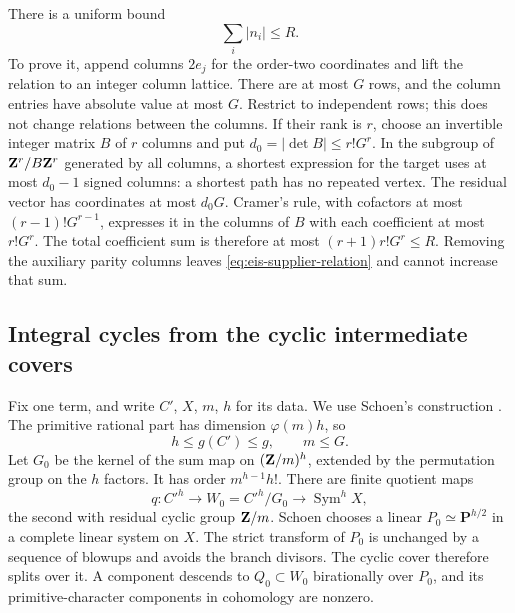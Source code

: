 There is a uniform bound
\begin{equation}\label{eq:eis-relation-mass}
 \sum_i|n_i|\le R.
\end{equation}
To prove it, append columns $2e_j$ for the order-two coordinates and
lift the relation to an integer column lattice. There are at most $G$
rows, and the column entries have absolute value at most $G$. Restrict
to independent rows; this does not change relations between the
columns. If their rank is $r$, choose an invertible integer matrix $B$
of $r$ columns and put $d_0=|\det B|\le r!G^r$. In the subgroup of
$\mathbf Z^r/B\mathbf Z^r$ generated by all columns, a shortest expression for the
target uses at most $d_0-1$ signed columns: a shortest path has no
repeated vertex. The residual vector has coordinates at most $d_0G$.
Cramer's rule, with cofactors at most $(r-1)!G^{r-1}$, expresses it in
the columns of $B$ with each coefficient at most $r!G^r$. The total
coefficient sum is therefore at most $(r+1)r!G^r\le R$. Removing the
auxiliary parity columns leaves \eqref{eq:eis-supplier-relation} and
cannot increase that sum.

\subsection{Integral cycles from the cyclic intermediate covers}

Fix one term, and write $C'$, $X$, $m$, $h$ for its data. We use
Schoen's construction \cite[Theorem~2.0 and Lemmas~2.3--2.6,
pp.~11--17]{Schoen88}. The primitive rational part has dimension
$\varphi(m)h$, so
\[
 h\le g(C')\le g,
 \qquad m\le G.
\]
Let $G_0$ be the kernel of the sum map on $(\mathbf Z/m)^h$, extended by
the permutation group on the $h$ factors. It has order
$m^{h-1}h!$. There are finite quotient maps
\[
 q:C'^h\longrightarrow W_0=C'^h/G_0
       \longrightarrow\operatorname{Sym}^hX,
\]
the second with residual cyclic group $\mathbf Z/m$. Schoen chooses a linear
$P_0\simeq\mathbf P^{h/2}$ in a complete linear system on $X$. The
strict transform of $P_0$ is unchanged by a sequence of blowups and
avoids the branch divisors. The cyclic cover therefore splits over it.
A component descends to $Q_0\subset W_0$ birationally over $P_0$,
and its primitive-character components in cohomology are nonzero.

